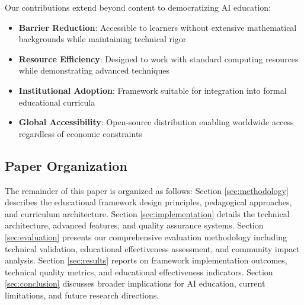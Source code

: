 Our contributions extend beyond content to democratizing AI education:

\begin{itemize}
    \item \textbf{Barrier Reduction}: Accessible to learners without extensive mathematical backgrounds while maintaining technical rigor
    \item \textbf{Resource Efficiency}: Designed to work with standard computing resources while demonstrating advanced techniques
    \item \textbf{Institutional Adoption}: Framework suitable for integration into formal educational curricula
    \item \textbf{Global Accessibility}: Open-source distribution enabling worldwide access regardless of economic constraints
\end{itemize}

\subsection{Paper Organization}

The remainder of this paper is organized as follows: Section \ref{sec:methodology} describes the educational framework design principles, pedagogical approaches, and curriculum architecture. Section \ref{sec:implementation} details the technical architecture, advanced features, and quality assurance systems. Section \ref{sec:evaluation} presents our comprehensive evaluation methodology including technical validation, educational effectiveness assessment, and community impact analysis. Section \ref{sec:results} reports on framework implementation outcomes, technical quality metrics, and educational effectiveness indicators. Section \ref{sec:conclusion} discusses broader implications for AI education, current limitations, and future research directions.